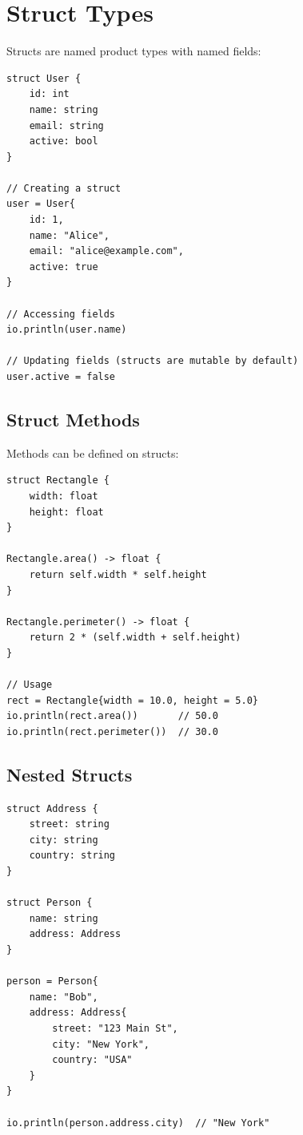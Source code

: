 \section{Struct Types}

Structs are named product types with named fields:

\begin{lstlisting}
struct User {
    id: int
    name: string
    email: string
    active: bool
}

// Creating a struct
user = User{
    id: 1,
    name: "Alice",
    email: "alice@example.com",
    active: true
}

// Accessing fields
io.println(user.name)

// Updating fields (structs are mutable by default)
user.active = false
\end{lstlisting}

\subsection{Struct Methods}

Methods can be defined on structs:

\begin{lstlisting}
struct Rectangle {
    width: float
    height: float
}

Rectangle.area() -> float {
    return self.width * self.height
}

Rectangle.perimeter() -> float {
    return 2 * (self.width + self.height)
}

// Usage
rect = Rectangle{width = 10.0, height = 5.0}
io.println(rect.area())       // 50.0
io.println(rect.perimeter())  // 30.0
\end{lstlisting}

\subsection{Nested Structs}

\begin{lstlisting}
struct Address {
    street: string
    city: string
    country: string
}

struct Person {
    name: string
    address: Address
}

person = Person{
    name: "Bob",
    address: Address{
        street: "123 Main St",
        city: "New York",
        country: "USA"
    }
}

io.println(person.address.city)  // "New York"
\end{lstlisting}

